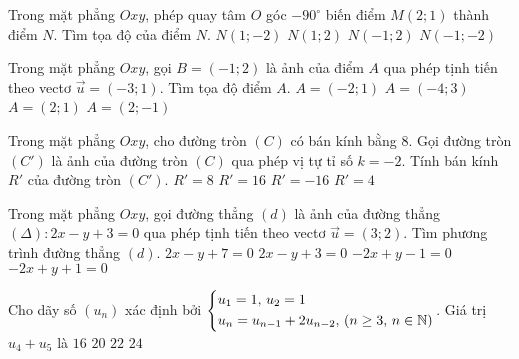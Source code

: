 \begin{ex}%
Trong mặt phẳng $Oxy$, phép quay tâm $O$ góc $-90^{\circ}$ biến điểm $M(2;1)$ thành điểm $N$. Tìm tọa độ của điểm $N$.
\choice 
{\True $N(1;-2)$}
{$N(1;2)$}
{$N(-1;2)$}
{$N(-1;-2)$}
\end{ex}
\begin{ex}%
Trong mặt phẳng $Oxy$, gọi $B=\left(-1;2\right)$ là ảnh của điểm $A$ qua phép tịnh tiến theo vectơ $\vec{u}=(-3;1)$. Tìm tọa độ điểm $A$.
\choice 
{$A=(-2;1)$}
{$A=(-4;3)$}
{\True $A=(2;1)$}
{$A=(2;-1)$}
\end{ex}
\begin{ex}%
Trong mặt phẳng $Oxy$, cho đường tròn $(C)$ có bán kính bằng $8$. Gọi đường tròn $(C')$ là ảnh của đường tròn $(C)$ qua phép vị tự tỉ số $k=-2$. Tính bán kính $R'$ của đường tròn $(C')$.
\choice 
{$R'=8$}
{\True $R'=16$}
{$R'=-16$}
{$R'=4$}
\end{ex}
\begin{ex}%
Trong mặt phẳng $Oxy$, gọi đường thẳng $(d)$ là ảnh của đường thẳng $(\Delta)\colon 2x-y+3=0$ qua phép tịnh tiến theo vectơ $\vec{u}=(3;2)$. Tìm phương trình đường thẳng $(d)$.
\choice 
{$2x-y+7=0$}
{$2x-y+3=0$}
{$-2x+y-1=0$}
{\True $-2x+y+1=0$}
\end{ex}
\begin{ex}%
Cho dãy số $(u_n)$ xác định bởi $\left\{\begin{aligned}&u_1=1,\, u_2=1\\&u_n=u_{n-1}+2u_{n-2},\, (n\geq 3,\, n\in \mathbb{N})\end{aligned}\right.$. Giá trị $u_4+u_5$ là
\choice 
{\True $16$}
{$20$}
{$22$}
{$24$}
\end{ex}
